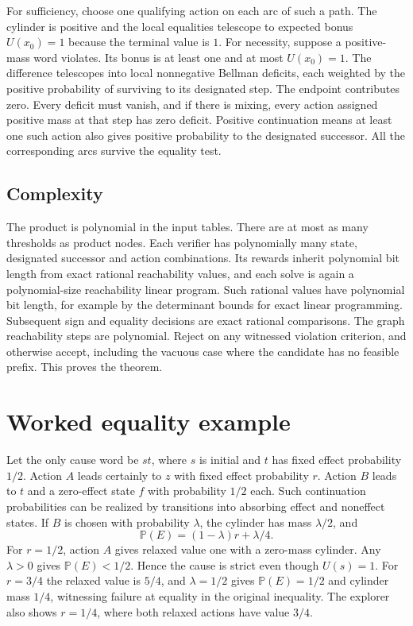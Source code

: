 \documentclass[11pt,a4paper]{amsart}
\newcommand{\Prb}{\mathbb P}
\begin{document}
For sufficiency, choose one qualifying action on each arc of such a path. The cylinder is positive and the local equalities telescope to expected bonus $U(x_0)=1$ because the terminal value is $1$. For necessity, suppose a positive-mass word violates. Its bonus is at least one and at most $U(x_0)=1$. The difference telescopes into local nonnegative Bellman deficits, each weighted by the positive probability of surviving to its designated step. The endpoint contributes zero. Every deficit must vanish, and if there is mixing, every action assigned positive mass at that step has zero deficit. Positive continuation means at least one such action also gives positive probability to the designated successor. All the corresponding arcs survive the equality test.

\subsection*{Complexity}
The product is polynomial in the input tables. There are at most as many thresholds as product nodes. Each verifier has polynomially many state, designated successor and action combinations. Its rewards inherit polynomial bit length from exact rational reachability values, and each solve is again a polynomial-size reachability linear program. Such rational values have polynomial bit length, for example by the determinant bounds for exact linear programming. Subsequent sign and equality decisions are exact rational comparisons. The graph reachability steps are polynomial. Reject on any witnessed violation criterion, and otherwise accept, including the vacuous case where the candidate has no feasible prefix. This proves the theorem.

\section{Worked equality example}
Let the only cause word be $st$, where $s$ is initial and $t$ has fixed effect probability $1/2$. Action $A$ leads certainly to $z$ with fixed effect probability $r$. Action $B$ leads to $t$ and a zero-effect state $f$ with probability $1/2$ each. Such continuation probabilities can be realized by transitions into absorbing effect and noneffect states. If $B$ is chosen with probability $\lambda$, the cylinder has mass $\lambda/2$, and
\[
        \Prb(E)=(1-\lambda)r+\lambda/4.
\]
For $r=1/2$, action $A$ gives relaxed value one with a zero-mass cylinder. Any $\lambda>0$ gives $\Prb(E)<1/2$. Hence the cause is strict even though $U(s)=1$. For $r=3/4$ the relaxed value is $5/4$, and $\lambda=1/2$ gives $\Prb(E)=1/2$ and cylinder mass $1/4$, witnessing failure at equality in the original inequality. The explorer also shows $r=1/4$, where both relaxed actions have value $3/4$.
\end{document}

